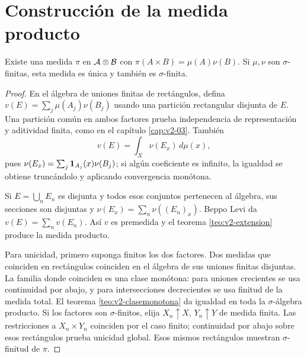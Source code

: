 \section{Construcción de la medida producto}
\begin{proposicion}\label{prop:v2-producto}
Existe una medida $\pi$ en $\mathcal A\otimes\mathcal B$ con $\pi(A\times B)=\mu(A)\nu(B)$. Si $\mu,\nu$ son $\sigma$-finitas, esta medida es única y también es $\sigma$-finita.
\end{proposicion}
\begin{proof}
En el álgebra de uniones finitas de rectángulos, defina $v(E)=\sum_j\mu(A_j)\nu(B_j)$ usando una partición rectangular disjunta de $E$. Una partición común en ambos factores prueba independencia de representación y aditividad finita, como en el capítulo \ref{cap:v2-03}. También
\[v(E)=\int_X\nu(E_x)\,d\mu(x),\]
pues $\nu(E_x)=\sum_j\mathbf1_{A_j}(x)\nu(B_j)$; si algún coeficiente es infinito, la igualdad se obtiene truncándolo y aplicando convergencia monótona.

Si $E=\bigcup_nE_n$ es disjunta y todos esos conjuntos pertenecen al álgebra, sus secciones son disjuntas y $\nu(E_x)=\sum_n\nu((E_n)_x)$. Beppo Levi da $v(E)=\sum_nv(E_n)$. Así $v$ es premedida y el teorema \ref{teo:v2-extension} produce la medida producto.

Para unicidad, primero suponga finitos los dos factores. Dos medidas que coinciden en rectángulos coinciden en el álgebra de sus uniones finitas disjuntas. La familia donde coinciden es una clase monótona: para uniones crecientes se usa continuidad por abajo, y para intersecciones decrecientes se usa finitud de la medida total. El teorema \ref{teo:v2-clasemonotona} da igualdad en toda la $\sigma$-álgebra producto. Si los factores son $\sigma$-finitos, elija $X_n\uparrow X$, $Y_n\uparrow Y$ de medida finita. Las restricciones a $X_n\times Y_n$ coinciden por el caso finito; continuidad por abajo sobre esos rectángulos prueba unicidad global. Esos mismos rectángulos muestran $\sigma$-finitud de $\pi$.
\end{proof}


